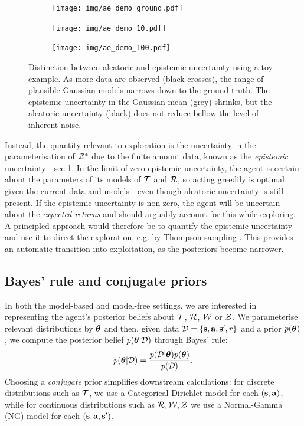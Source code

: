 \documentclass{article}
\begin{document}
\begin{figure}[h!]
\centering
\begin{subfigure}{0.22\textwidth}
\texttt{[image: img/ae\_demo\_ground.pdf]}
\end{subfigure}
\begin{subfigure}{0.22\textwidth}
\texttt{[image: img/ae\_demo\_10.pdf]}
\end{subfigure}
\begin{subfigure}{0.22\textwidth}
\texttt{[image: img/ae\_demo\_100.pdf]}
\end{subfigure}
\captionsetup{width=0.9\linewidth}
\caption{Distinction between aleatoric and epistemic uncertainty using a toy example. As more data are observed (black crosses), the range of plausible Gaussian models narrows down to the ground truth. The epistemic uncertainty in the Gaussian mean (grey) shrinks, but the aleatoric uncertainty (black) does not reduce bellow the level of inherent noise.}\label{ae_demo}
\end{figure}

Instead, the quantity relevant to exploration is the uncertainty in the parameterisation of $\mathcal{Z}^*$ due to the finite amount data, known as the \textit{epistemic} uncertainty - see \cref{ae_demo}. In the limit of zero epistemic uncertainty, the agent is certain about the parameters of its models of $\mathcal{T}$ and $\mathcal{R}$, so acting greedily is optimal given the current data and models - even though aleatoric uncertainty is still present. If the epistemic uncertainty is non-zero, the agent will be uncertain about the \textit{expected returns} and should arguably account for this while exploring. A principled approach would therefore be to quantify the epistemic uncertainty and use it to direct the exploration, e.g. by Thompson sampling \citep{thompson}. This provides an automatic transition into exploitation, as the posteriors become narrower.

\subsection{Bayes' rule and conjugate priors}

In both the model-based and model-free settings, we are interested in representing the agent's posterior beliefs about $\mathcal{T}$, $\mathcal{R}$, $\mathcal{W}$ or $\mathcal{Z}$. We parameterise relevant distributions by $\boldsymbol{\theta}$ and then, given data $\mathcal{D} = \{\mathbf{s}, \mathbf{a}, \mathbf{s}', r\}$ and a prior $p(\boldsymbol{\theta})$, we compute the posterior belief $p(\boldsymbol{\theta} | \mathcal{D})$ through Bayes' rule:
\begin{align}
p(\boldsymbol{\theta} | \mathcal{D}) = \frac{p(\mathcal{D} | \boldsymbol{\theta}) p(\boldsymbol{\theta})}{p(\mathcal{D})}.
\end{align}
Choosing a \textit{conjugate} prior simplifies downstream calculations: for discrete distributions such as $\mathcal{T}$, we use a Categorical-Dirichlet model \citep{bishop} for each $(\mathbf{s}, \mathbf{a})$, while for continuous distributions such as $\mathcal{R}, \mathcal{W}, \mathcal{Z}$ we use a Normal-Gamma (NG) model \citep{murphy} for each $(\mathbf{s}, \mathbf{a}, \mathbf{s}')$.
\end{document}
